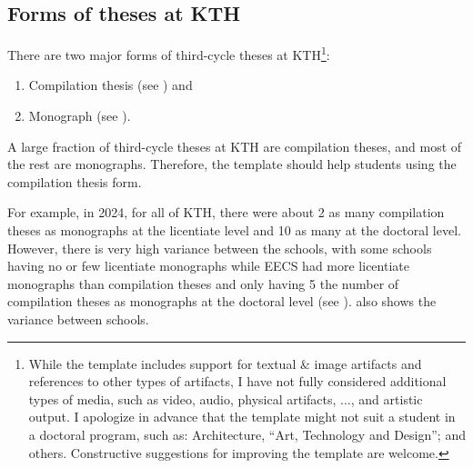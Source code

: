 \documentclass[12pt, twoside]{article}
\begin{document}
\subsection{Forms of theses at KTH}
\label{sec:cycle3TypsofTheses}

There are two major forms of third-cycle theses at \gls{KTH}\footnote{While the template includes support for textual \& image artifacts and references to other types of artifacts, I have not fully considered additional types of media, such as video, audio, physical artifacts, $\ldots$, and artistic output.  I apologize in advance that the template might not suit a student in a doctoral program, such as: Architecture, \enquote{Art, Technology and Design}; and others. Constructive suggestions for improving the template are welcome.}:
\begin{enumerate}
    \item Compilation thesis (see ) and
    \item Monograph (see ).
\end{enumerate}

A large fraction of third-cycle theses at \gls{KTH} are compilation theses, and most of the rest are monographs.  Therefore, the template should help students using the compilation thesis form.

For example, in 2024, for all of \gls{KTH}, there were about 2{\mystixmathfont \times} as many compilation theses as monographs at the licentiate level and 10{\mystixmathfont \times} as many at the doctoral level. However, there is very high variance between the schools, with some schools having no or few licentiate monographs while EECS had more licentiate monographs than compilation theses and only having 5{\mystixmathfont \times} the number of compilation theses as monographs at the doctoral level (see ).   also shows the variance between schools.
\end{document}
